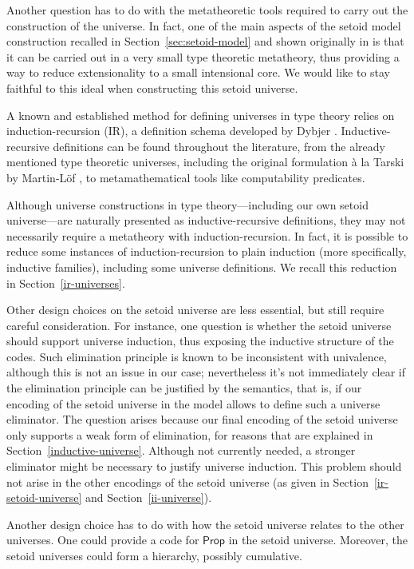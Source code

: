 \documentclass[autoref]{llncs}
\newcommand{\Prop}{\textsf{Prop}}
\begin{document}
Another question has to do with the metatheoretic tools required to carry out
the construction of the universe. In fact, one of the main aspects of the setoid
model construction recalled in Section~\ref{sec:setoid-model} and shown originally
in \cite{setoid99} is that it can be carried out in a very small type theoretic
metatheory, thus providing a way to reduce extensionality to a small intensional
core.
%
We would like to stay faithful to this ideal when constructing this setoid
universe.

A known and established method for defining universes in type theory relies on
induction-recursion (IR), a definition schema developed by Dybjer
\cite{ir-dybjer,dybjer-setzer}. Inductive-recursive definitions can be found
throughout the literature, from the already mentioned type theoretic universes,
including the original formulation \`{a} la Tarski by Martin-L\"of
\cite{libretto}, to metamathematical tools like computability predicates.

Although universe constructions in type theory---including our own setoid
universe---are naturally presented as inductive-recursive definitions, they may
not necessarily require a metatheory with induction-recursion. In fact, it is
possible to reduce some instances of induction-recursion to plain induction
(more specifically, inductive families), including some universe definitions. We
recall this reduction in Section~\ref{ir-universes}.

Other design choices on the setoid universe are less essential, but still
require careful consideration. For instance, one question is whether the setoid
universe should support universe induction, thus exposing the inductive
structure of the codes. Such elimination principle is known to be inconsistent
with univalence, although this is not an issue in our case; nevertheless it's
not immediately clear if the elimination principle can be justified by the
semantics, that is, if our encoding of the setoid universe in the model allows
to define such a universe eliminator.
%
The question arises because our final encoding of the setoid universe only
supports a weak form of elimination, for reasons that are explained in
Section~\ref{inductive-universe}. Although not currently needed, a stronger
eliminator might be necessary to justify universe induction. This problem should
not arise in the other encodings of the setoid universe (as given in
Section~\ref{ir-setoid-universe} and Section~\ref{ii-universe}).

Another design choice has to do with how the setoid universe relates to the
other universes. One could provide a code for $\Prop$ in the setoid universe.
Moreover, the setoid universes could form a hierarchy, possibly
cumulative.
\end{document}
